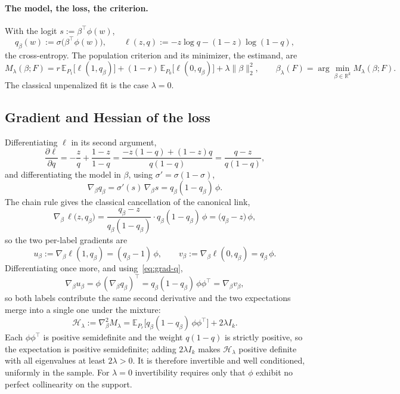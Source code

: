 \documentclass[11pt]{article}
\newcommand{\Eb}{\mathbb{E}}
\newcommand{\Hb}{\mathcal{H}}
\begin{document}
\paragraph{The model, the loss, the criterion.}
With the logit $s:=\beta^\top\phi(w)$,
\[
q_\beta(w) := \sigma\big(\beta^\top\phi(w)\big),
\qquad
\ell(z,q) := -z\log q-(1-z)\log(1-q),
\]
the cross-entropy. The population criterion and its minimizer, the estimand, are
\begin{equation}
M_\lambda(\beta;F)
= r\,\Eb_{P_1}\big[\ell(1,q_\beta)\big]
+ (1-r)\,\Eb_{P_0}\big[\ell(0,q_\beta)\big]
+ \lambda\|\beta\|_2^2,
\qquad
\beta_\lambda(F)=\arg\min_{\beta\in\mathbb{R}^k} M_\lambda(\beta;F).
\label{eq:criterion}
\end{equation}
The classical unpenalized fit is the case $\lambda=0$.

\subsection{Gradient and Hessian of the loss}
\label{sec:grads}

Differentiating $\ell$ in its second argument,
\[
\frac{\partial\ell}{\partial q}
= -\frac{z}{q}+\frac{1-z}{1-q}
= \frac{-z(1-q)+(1-z)q}{q(1-q)}
= \frac{q-z}{q(1-q)},
\]
and differentiating the model in $\beta$, using $\sigma'=\sigma(1-\sigma)$,
\begin{equation}
\nabla_\beta q_\beta = \sigma'(s)\,\nabla_\beta s = q_\beta(1-q_\beta)\,\phi.
\label{eq:grad-q}
\end{equation}
The chain rule gives the classical cancellation of the canonical link,
\begin{equation}
\nabla_\beta\,\ell\big(z,q_\beta\big)
= \frac{q_\beta-z}{q_\beta(1-q_\beta)}\cdot q_\beta(1-q_\beta)\,\phi
= \big(q_\beta-z\big)\,\phi,
\label{eq:grad-loss}
\end{equation}
so the two per-label gradients are
\begin{equation}
u_\beta := \nabla_\beta\ell(1,q_\beta) = (q_\beta-1)\,\phi,
\qquad
v_\beta := \nabla_\beta\ell(0,q_\beta) = q_\beta\,\phi.
\label{eq:uv}
\end{equation}
Differentiating once more, and using~\eqref{eq:grad-q},
\[
\nabla_\beta u_\beta = \phi\,(\nabla_\beta q_\beta)^\top = q_\beta(1-q_\beta)\,\phi\phi^\top
= \nabla_\beta v_\beta,
\]
so both labels contribute the same second derivative and the two expectations merge
into a single one under the mixture:
\begin{equation}
\Hb_\lambda := \nabla^2_\beta M_\lambda
= \Eb_{P_r}\big[q_\beta(1-q_\beta)\,\phi\phi^\top\big] + 2\lambda I_k.
\label{eq:hessian}
\end{equation}
Each $\phi\phi^\top$ is positive semidefinite and the weight $q(1-q)$ is strictly
positive, so the expectation is positive semidefinite; adding $2\lambda I_k$ makes
$\Hb_\lambda$ positive definite with all eigenvalues at least $2\lambda>0$. It is
therefore invertible and well conditioned, uniformly in the sample. For $\lambda=0$
invertibility requires only that $\phi$ exhibit no perfect collinearity on the
support.
\end{document}
